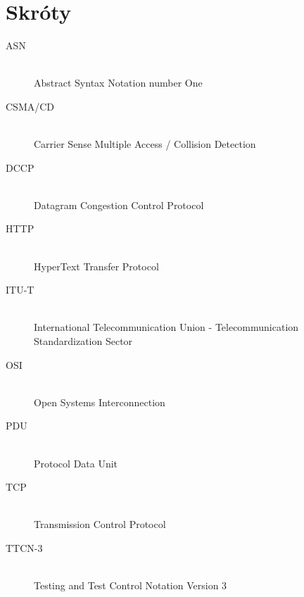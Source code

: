 \documentclass[00-praca-magisterska.tex]{subfiles}
\begin{document}
\appendix
\chapter{Skróty}

\begin{description}
  \item[ASN] \hfill \\ Abstract Syntax Notation number One
  \item[CSMA/CD] \hfill \\ Carrier Sense Multiple Access / Collision Detection
  \item[DCCP] \hfill \\ Datagram Congestion Control Protocol
  \item[HTTP] \hfill \\ HyperText Transfer Protocol
  \item[ITU-T] \hfill \\ International Telecommunication Union - Telecommunication Standardization Sector
  \item[OSI] \hfill \\ Open Systems Interconnection
  \item[PDU] \hfill \\ Protocol Data Unit
  \item[TCP] \hfill \\ Transmission Control Protocol
  \item[TTCN-3] \hfill \\ Testing and Test Control Notation Version 3
\end{description}
\end{document}
